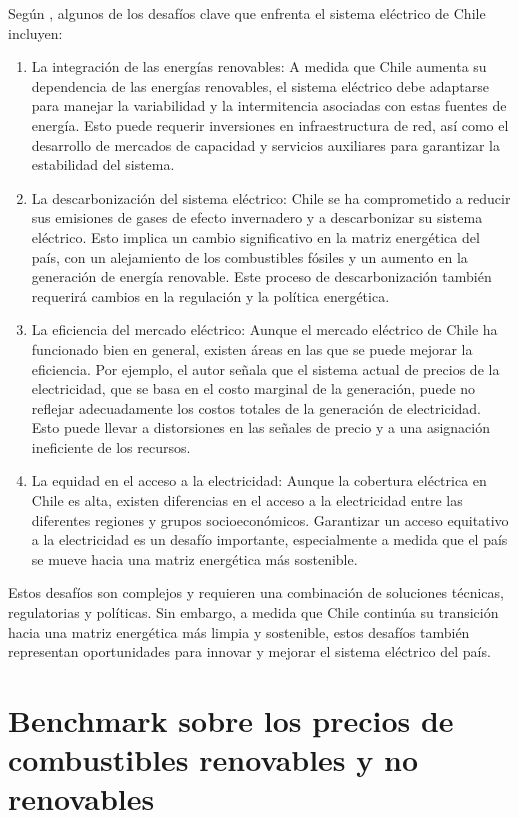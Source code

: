 Según , algunos de los desafíos clave que enfrenta el sistema eléctrico de Chile incluyen:
\begin{enumerate}
\item 
La integración de las energías renovables: A medida que Chile aumenta su dependencia de las energías renovables, el sistema eléctrico debe adaptarse para manejar la variabilidad y la intermitencia asociadas con estas fuentes de energía. Esto puede requerir inversiones en infraestructura de red, así como el desarrollo de mercados de capacidad y servicios auxiliares para garantizar la estabilidad del sistema.
\item 
La descarbonización del sistema eléctrico: Chile se ha comprometido a reducir sus emisiones de gases de efecto invernadero y a descarbonizar su sistema eléctrico. Esto implica un cambio significativo en la matriz energética del país, con un alejamiento de los combustibles fósiles y un aumento en la generación de energía renovable. Este proceso de descarbonización también requerirá cambios en la regulación y la política energética.
\item 
La eficiencia del mercado eléctrico: Aunque el mercado eléctrico de Chile ha funcionado bien en general, existen áreas en las que se puede mejorar la eficiencia. Por ejemplo, el autor señala que el sistema actual de precios de la electricidad, que se basa en el costo marginal de la generación, puede no reflejar adecuadamente los costos totales de la generación de electricidad. Esto puede llevar a distorsiones en las señales de precio y a una asignación ineficiente de los recursos.
\item 
La equidad en el acceso a la electricidad: Aunque la cobertura eléctrica en Chile es alta, existen diferencias en el acceso a la electricidad entre las diferentes regiones y grupos socioeconómicos. Garantizar un acceso equitativo a la electricidad es un desafío importante, especialmente a medida que el país se mueve hacia una matriz energética más sostenible.
\end{enumerate}

Estos desafíos son complejos y requieren una combinación de soluciones técnicas, regulatorias y políticas. Sin embargo, a medida que Chile continúa su transición hacia una matriz energética más limpia y sostenible, estos desafíos también representan oportunidades para innovar y mejorar el sistema eléctrico del país.

\section{Benchmark sobre los precios de combustibles renovables y no renovables}\label{c23}

